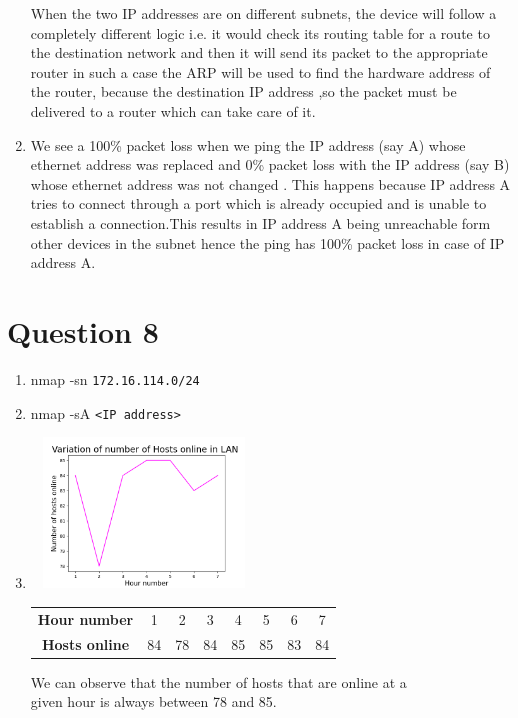 \documentclass[a4paper,11pt]{article}
\begin{document}
\begin{enumerate}[itemsep=-3pt,label=(\alph*)]
	When the two IP addresses are on different subnets, the device will follow a completely different logic i.e. it would check its routing table for a route to the destination network and then it will send its packet to the appropriate router in such a case the ARP will be used to find the hardware address of the router, because the destination IP address ,so the packet must be delivered to a router which can take care of it.
	\item We see a 100\% packet loss when we ping the IP address (say A) whose ethernet address was replaced and 0\% packet loss with the IP address (say B) whose ethernet address was not changed .
	This happens because IP address A tries to connect through a port which is already occupied and is unable to establish a connection.This results in IP address A being unreachable form other devices in the subnet hence the ping has 100\% packet loss in case of IP address A. 
\end{enumerate}

\section*{Question 8}
\begin{enumerate}[itemsep=-3pt,label=(\alph*)]
	\item nmap -sn \verb|172.16.114.0/24|
	\item nmap -sA \verb|<IP address>|
	\item \includegraphics[height=40mm,width=60mm]{host}
	\hspace{180mm}\vspace{-40mm}
	\FloatBarrier
	\begin{table}[h]
		\begin{tabular}{c|c|c|c|c|c|c|c|}
			\hspace{75mm}\textbf{Hour number}&1&2&3&4&5&6&7\\
			\hspace{75mm}\textbf{Hosts online}&84&78&84&85&85&83&84\\
		\end{tabular}
	\end{table}
	\FloatBarrier
	\hspace{66mm} We can observe that the number of hosts that are online at a\\ \phantom{x}\hspace{66mm}given hour is always between 78 and 85.
\end{enumerate}
\end{document}
